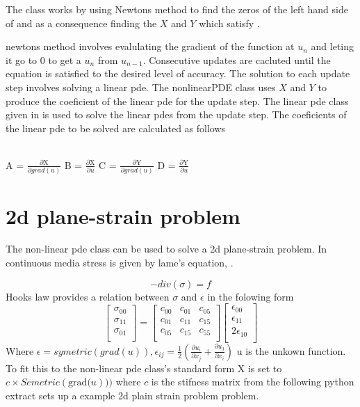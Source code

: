 The class works by using Newtons method to find the zeros of the left hand side of  and as a consequence finding the
$X$ and $Y$ which satisfy . 

newtons method involves evalulating the gradient of the function at $u_n$ and leting it go to 0 to get a $u_n$ from $u_{n-1}$. Consecutive updates are cacluted until the equation is
satisfied to the desired level of accuracy. The solution to each update step involves solving a linear pde. The nonlinearPDE class uses $X$ and $Y$ to produce the coeficient of the linear pde for the update step. The linear pde class given in  is used to solve the linear pdes from the update step. The coeficients of the linear pde to be solved are calculated as follows \\\\\begin{centering}
 A = $\frac{\partial \text{X}}{\partial grad(u)}$   B = $\frac{\partial \text{X}}{\partial u}$   C = $\frac{\partial \text{Y}}{\partial grad(u)}$    D = $\frac{\partial \text{Y}}{\partial u}$
\end{centering}



\section{2d plane-strain problem}
The non-linear pde class can be used to solve a 2d plane-strain problem. In continuous media stress is given by lame's equation, .

\begin{equation} 
-div(\sigma)=f
\label{symbolic eq2}
\end{equation} 
Hooks law provides a relation between $\sigma$ and $\epsilon$ in the folowing form
\begin{equation}
\left[ \begin{array}{c}
\sigma_{00} \\
\sigma_{11} \\
\sigma_{01} \\
\end{array} \right] = 
\left[ \begin{array}{ccc}
c_{00} & c_{01} & c_{05}\\
c_{01} & c_{11} & c_{15}\\
c_{05} & c_{15} & c_{55}\\
\end{array}\right]
\left[ \begin{array}{c}
\epsilon_{00} \\
\epsilon_{11} \\
2\epsilon_{10} \\
\end{array} \right]
\label{symbolic eq3}
\end{equation}
Where $\epsilon = symetric(grad(u)), \epsilon_{ij}=\frac{1}{2}\left(\frac{\partial u_i}{\partial x_j} + {\frac{\partial u_j}{\partial x_i}}\right)$
u is the unkown function. To fit this to the non-linear pde class's standard form X is set to $c \times Semetric(\text{grad(}u)))$ where $c$ is the stifness matrix from 
the following python extract sets up a example 2d plain strain problem problem. 

